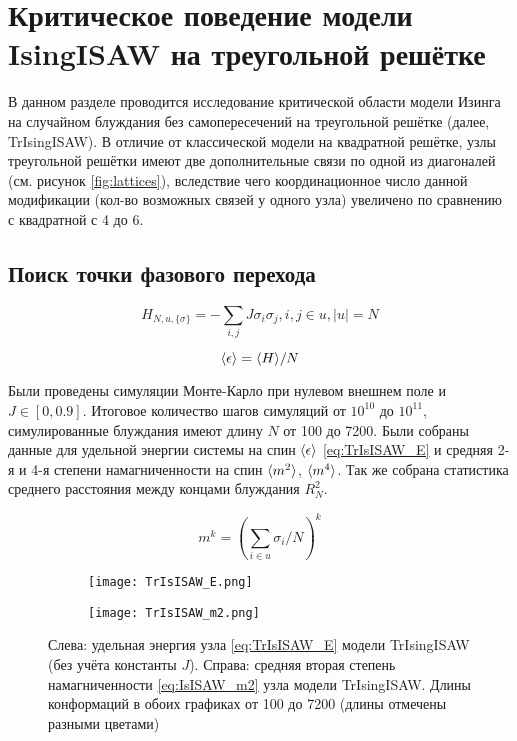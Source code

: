 \section{Критическое поведение модели IsingISAW на треугольной решётке}

В данном разделе проводится исследование критической области модели Изинга на случайном блуждания без самопересечений на треугольной решётке (далее, TrIsingISAW).
В отличие от классической модели на квадратной решётке, узлы треугольной решётки имеют две дополнительные связи по одной из диагоналей (см. рисунок \ref{fig:lattices}), 
вследствие чего координационное число данной модификации (кол-во возможных связей у одного узла) увеличено по сравнению с квадратной с 4 до 6.

\subsection{Поиск точки фазового перехода}

\begin{equation}
\label{eq:IsISAW_H}
 H_{N,u,\{\sigma\}} = -\sum_{i,j} J\sigma_i \sigma_j, i,j \in u, |u| = N
\end{equation}

\begin{equation}
\label{eq:TrIsISAW_E}
\langle \epsilon \rangle = \langle H \rangle / N
\end{equation}

Были проведены симуляции Монте-Карло при нулевом внешнем поле и $J \in [0,0.9]$. 
Итоговое количество шагов симуляций от $10^10$ до $10^11$, симулированные блуждания имеют длину $N$ от 100 до 7200.
Были собраны данные для удельной энергии системы на спин $\langle \epsilon \rangle$ \eqref{eq:TrIsISAW_E} и средняя 2-я и 4-я степени намагниченности на спин $\langle m^2 \rangle$, $\langle m^4 \rangle$.
Так же собрана статистика среднего расстояния между концами блуждания $R^2_N$.

\begin{equation}
\label{eq:IsISAW_m2}
	m^{k} = (\sum_{i \in u} \sigma_i / N)^k
\end{equation}

\begin{figure}[h]
\begin{subfigure}{0.49\textwidth}
\texttt{[image: TrIsISAW\_E.png]}
\label{fig:TrIsISAW_E}
\end{subfigure}
\hfill
\begin{subfigure}{0.49\textwidth}
\texttt{[image: TrIsISAW\_m2.png]}
\label{fig:TrIsISAW_m2}
\end{subfigure}
\caption{Слева: удельная энергия узла \eqref{eq:TrIsISAW_E} модели TrIsingISAW (без учёта константы $J$).
Справа: средняя вторая степень намагниченности \eqref{eq:IsISAW_m2} узла модели TrIsingISAW. 
Длины конформаций в обоих графиках от 100 до 7200 (длины отмечены разными цветами)}

\end{figure}


